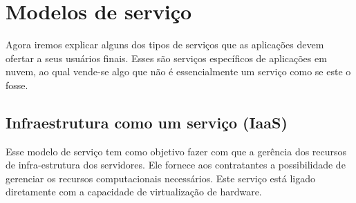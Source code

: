 \documentclass[
	12pt,				%
	openright,			%
	twoside,			%
	a4paper,			%
	Times,
	brazil,				%
	]{abntex2}
\begin{document}
%
%



\chapter{Modelos de serviço}
Agora iremos explicar alguns dos tipos de serviços que as aplicações devem ofertar a seus usuários finais. Esses são serviços específicos de aplicações em nuvem, ao qual vende-se algo que não é essencialmente um serviço como se este o fosse\cite{web2.0}.
\par

\section{Infraestrutura como um serviço (IaaS)}
Esse modelo de serviço tem como objetivo fazer com que a gerência dos recursos de infra-estrutura dos servidores. Ele fornece aos contratantes a possibilidade de gerenciar os recursos computacionais necessários. Este serviço está ligado diretamente com a capacidade de virtualização de hardware\cite{saas, nuvem, nuvem2}.
\par
\end{document}
